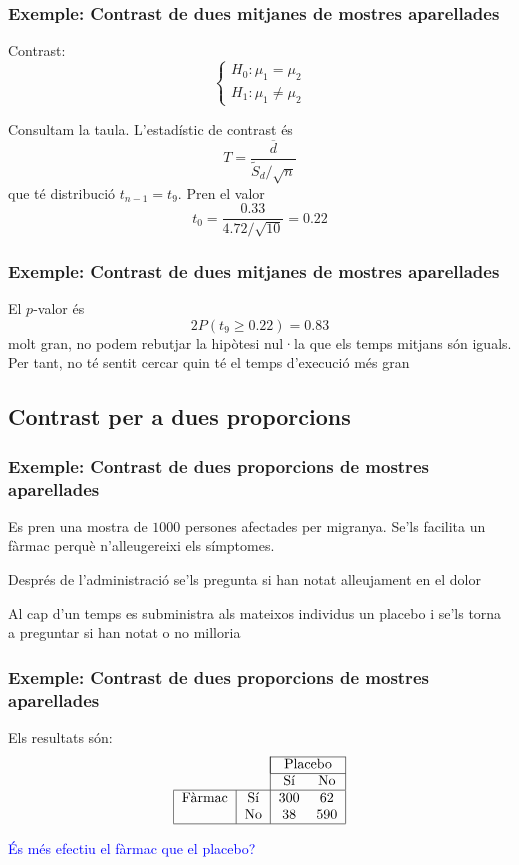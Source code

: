 \documentclass[12pt,t]{beamer}
\newcommand{\blue}[1]{\textcolor{blue}{#1}}
\renewcommand{\emph}[1]{{\color{red}#1}}
\renewcommand{\geq}{\geqslant}
\theoremstyle{plain}
\theoremstyle{definition}
\begin{document}
\begin{frame}
\frametitle{Exemple: Contrast de dues mitjanes de mostres aparellades}
\emph{Contrast}:
$$
\left\{\begin{array}{l}
H_0:\mu_1=\mu_2\\
H_1:\mu_1\neq \mu_2
\end{array}\right.
$$


Consultam la taula. L'estadístic de contrast és
$$
T=\frac{\overline{d}}{\widetilde{S}_d/\sqrt{n}}
$$
que té distribució $t_{n-1}=t_9$. Pren el valor
$$
t_0=\frac{0.33}{4.72/\sqrt{10}}=0.22
$$


\end{frame}

\begin{frame}
\frametitle{Exemple: Contrast de dues mitjanes de mostres aparellades}


El $p$-valor és
$$
2P(t_9\geq 0.22)=0.83
$$
molt gran, no podem rebutjar la hipòtesi nul·la que els temps mitjans són iguals. Per tant, no té sentit cercar quin té el temps d'execució més gran
\end{frame}




\subsection{Contrast per a dues proporcions}
\begin{frame}
\frametitle{Exemple: Contrast de dues proporcions de mostres aparellades}

Es pren una mostra de $1000$ persones afectades per migranya. Se'ls
facilita un fàrmac perquè n'alleugereixi els símptomes.
\medskip

Després de l'administració se'ls pregunta si han notat alleujament en
el dolor
\medskip

Al cap d'un temps es subministra als mateixos individus un placebo
i se'ls torna a preguntar si han notat o no milloria
\end{frame}

\begin{frame}
\frametitle{Exemple: Contrast de dues proporcions de mostres aparellades}

Els resultats són:
$$
\begin{tabular}{|c|c|cc|}
\cline{3-4}
\multicolumn{2}{c|}{}& \multicolumn{2}{|c|} {Placebo}\\\cline{3-4}
\multicolumn{2}{c|}{} & Sí & No \\\hline
Fàrmac & Sí & 300 & 62 \\
& No & 38 & 590
\\\hline
\end{tabular}
$$

\blue{És més efectiu el fàrmac que el placebo?}
\end{frame}
\end{document}
